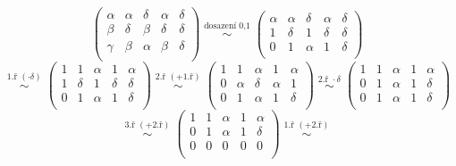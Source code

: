 \documentclass[12pt]{article}
\begin{document}
\begin{enumerate}
    \[
      \left(\begin{array}{cccc|c}
      \alpha & \alpha & \delta & \alpha & \delta \\
      \beta & \delta & \beta & \delta & \delta \\
      \gamma & \beta & \alpha & \beta & \delta \\
      \end{array}\right)
      \overset{\text{dosazení 0,1}}{\;\sim\;}
      \left(\begin{array}{cccc|c}
      \alpha & \alpha & \delta & \alpha & \delta \\
      1 & \delta & 1 & \delta & \delta \\
      0 & 1 & \alpha & 1 & \delta \\
      \end{array}\right)
    \]
    \[
      \overset{\text{1.ř } (\cdot \delta)}{\;\sim\;}
      \left(\begin{array}{cccc|c}
      1 & 1 & \alpha & 1 & \alpha \\
      1 & \delta & 1 & \delta & \delta \\
      0 & 1 & \alpha & 1 & \delta \\
      \end{array}\right)
      \overset{\text{2.ř }(+\text{1.ř})}{\;\sim\;}
      \left(\begin{array}{cccc|c}
      1 & 1 & \alpha & 1 & \alpha \\
      0 & \alpha & \delta & \alpha & 1 \\
      0 & 1 & \alpha & 1 & \delta \\
      \end{array}\right)
      \overset{\text{2.ř } \cdot \delta}{\;\sim\;}
      \left(\begin{array}{cccc|c}
      1 & 1 & \alpha & 1 & \alpha \\
      0 & 1 & \alpha & 1 & \delta \\
      0 & 1 & \alpha & 1 & \delta \\
      \end{array}\right)
    \]
    \[
      \overset{\text{3.ř } (+\text{2.ř})}{\;\sim\;}
      \left(\begin{array}{cccc|c}
      1 & 1 & \alpha & 1 & \alpha \\
      0 & 1 & \alpha & 1 & \delta \\
      0 & 0 & 0 & 0 & 0 \\
      \end{array}\right)
      \overset{\text{1.ř } (+ \text{2.ř})}{\;\sim\;}
\]
\end{enumerate}
\end{document}
